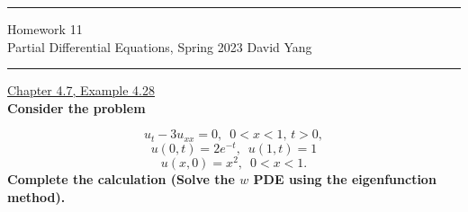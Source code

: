 \documentclass[11pt]{article}
\begin{document}
	\hrule
	\begin{center}
		{\Large Homework 11} \\ %
		\vspace{0.2cm}
		Partial Differential Equations, Spring 2023 \hfill David Yang %
	\end{center}

\hrule

\vspace{1em}


\underline{Chapter 4.7, Example 4.28} \\

\textbf{Consider the problem}

\[ u_t - 3u_{xx} = 0, \, \, \, 0 < x < 1, \, t > 0,\]
\[ u(0, t) = 2e^{-t}, \, \, \, u(1, t) = 1\]
\[ u(x, 0) = x^2, \, \, \, 0 < x < 1.\]
\textbf{Complete the calculation (Solve the $w$ PDE using the eigenfunction method).}
\end{document}
